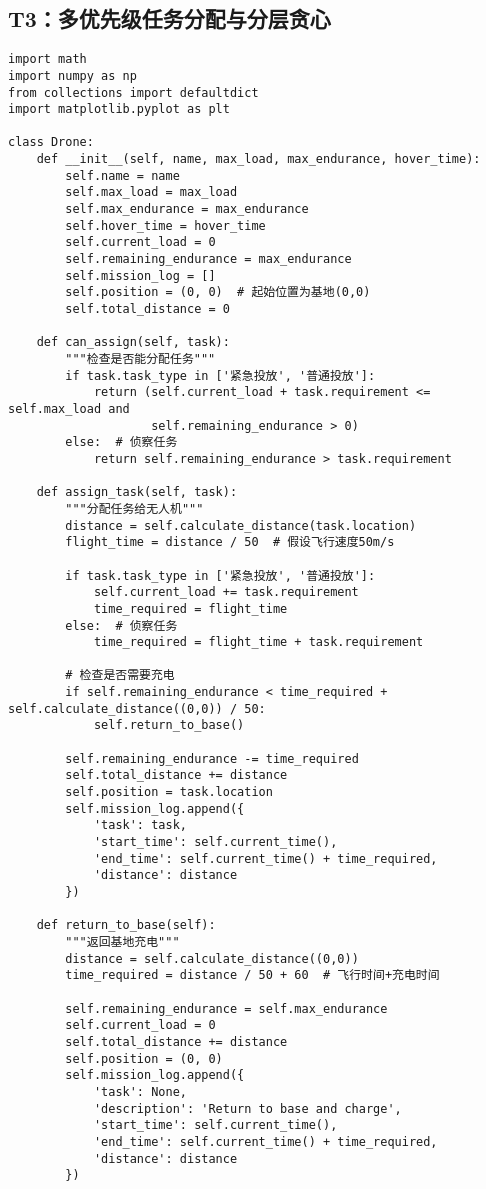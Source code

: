 \documentclass[12pt,fontset=adobe]{ctexart}
\begin{document}
\subsection*{T3：多优先级任务分配与分层贪心}
\begin{verbatim}
import math
import numpy as np
from collections import defaultdict
import matplotlib.pyplot as plt

class Drone:
    def __init__(self, name, max_load, max_endurance, hover_time):
        self.name = name
        self.max_load = max_load
        self.max_endurance = max_endurance
        self.hover_time = hover_time
        self.current_load = 0
        self.remaining_endurance = max_endurance
        self.mission_log = []
        self.position = (0, 0)  # 起始位置为基地(0,0)
        self.total_distance = 0

    def can_assign(self, task):
        """检查是否能分配任务"""
        if task.task_type in ['紧急投放', '普通投放']:
            return (self.current_load + task.requirement <= self.max_load and 
                    self.remaining_endurance > 0)
        else:  # 侦察任务
            return self.remaining_endurance > task.requirement

    def assign_task(self, task):
        """分配任务给无人机"""
        distance = self.calculate_distance(task.location)
        flight_time = distance / 50  # 假设飞行速度50m/s
        
        if task.task_type in ['紧急投放', '普通投放']:
            self.current_load += task.requirement
            time_required = flight_time
        else:  # 侦察任务
            time_required = flight_time + task.requirement
        
        # 检查是否需要充电
        if self.remaining_endurance < time_required + self.calculate_distance((0,0)) / 50:
            self.return_to_base()
        
        self.remaining_endurance -= time_required
        self.total_distance += distance
        self.position = task.location
        self.mission_log.append({
            'task': task,
            'start_time': self.current_time(),
            'end_time': self.current_time() + time_required,
            'distance': distance
        })
    
    def return_to_base(self):
        """返回基地充电"""
        distance = self.calculate_distance((0,0))
        time_required = distance / 50 + 60  # 飞行时间+充电时间
        
        self.remaining_endurance = self.max_endurance
        self.current_load = 0
        self.total_distance += distance
        self.position = (0, 0)
        self.mission_log.append({
            'task': None,
            'description': 'Return to base and charge',
            'start_time': self.current_time(),
            'end_time': self.current_time() + time_required,
            'distance': distance
        })
    

\end{verbatim}
\end{document}
